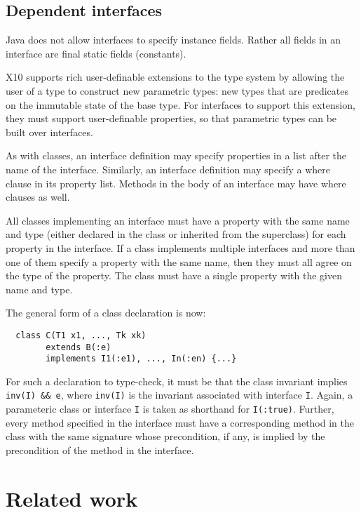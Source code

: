 \documentclass[nocopyrightspace,preprint,9pt]{sigplanconf}
\newcommand\java{{Java}}
\begin{document}
\subsection{Dependent interfaces}

\java{} does not allow interfaces to specify instance fields. Rather all
fields in an interface are final static fields (constants).

X10 supports rich user-definable extensions to the type system by
allowing the user of a type to construct new parametric types: new
types that are predicates on the immutable state of the base type.
For interfaces to support this extension, they must support
user-definable properties, so that parametric types can be
built over interfaces.

As with classes, an interface definition may specify properties
in a 
list after the name of the interface. Similarly, an interface
definition may specify a where clause in its property list. Methods
in the body of an interface may have where clauses
as well.

All classes implementing an interface must have a property
with the same name and
type (either declared in the class or inherited from the superclass)
for each property in the interface. If a class implements
multiple interfaces and more than one of them specify a property
with the same name, then they must all agree on the type of the
property. The class must have a single property with the given name
and type.

The general form of a class declaration is now:
\begin{verbatim}
  class C(T1 x1, ..., Tk xk)
        extends B(:e)
        implements I1(:e1), ..., In(:en) {...}
\end{verbatim}
\noindent
For such a
declaration to type-check, it must be that the class invariant
implies {\tt inv(I) \&\& e}, where {\tt inv(I)} is the invariant associated with
interface {\tt I}.  Again, a parameteric class or interface {\tt I} is taken as
shorthand for {\tt I(:true)}.  Further, every method specified in the
interface must have a corresponding method in the class with the same
signature whose precondition, if any, is implied by the precondition
of the method in the interface.




\section{Related work}
\label{sec:related}
\end{document}

